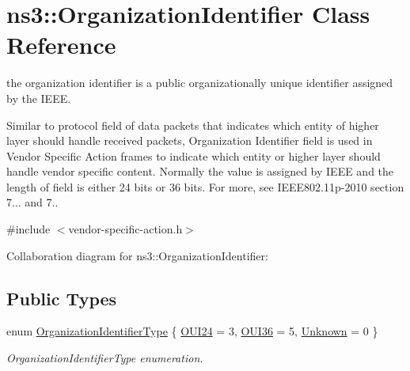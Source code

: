 \hypertarget{classns3_1_1OrganizationIdentifier}{}\section{ns3\+:\+:Organization\+Identifier Class Reference}
\label{classns3_1_1OrganizationIdentifier}


the organization identifier is a public organizationally unique identifier assigned by the I\+E\+EE.

Similar to protocol field of data packets that indicates which entity of higher layer should handle received packets, Organization Identifier field is used in Vendor Specific Action frames to indicate which entity or higher layer should handle vendor specific content. Normally the value is assigned by I\+E\+EE and the length of field is either 24 bits or 36 bits. For more, see I\+E\+E\+E802.\+11p-\/2010 section 7... and 7..  




{\ttfamily \#include $<$vendor-\/specific-\/action.\+h$>$}



Collaboration diagram for ns3\+:\+:Organization\+Identifier\+:
\subsection*{Public Types}
\begin{DoxyCompactItemize}
\item 
enum \hyperlink{classns3_1_1OrganizationIdentifier_a196c774c611f936ef8b7d2a760ff5ba2}{Organization\+Identifier\+Type} \{ \hyperlink{classns3_1_1OrganizationIdentifier_a196c774c611f936ef8b7d2a760ff5ba2acb416b621c8fbb5606ac3ddba5a24219}{O\+U\+I24} = 3, 
\hyperlink{classns3_1_1OrganizationIdentifier_a196c774c611f936ef8b7d2a760ff5ba2a812d1ac7a43fafd29b3f1dc34fa287b5}{O\+U\+I36} = 5, 
\hyperlink{classns3_1_1OrganizationIdentifier_a196c774c611f936ef8b7d2a760ff5ba2a23719ee8db159e989cc02fe8f547863e}{Unknown} = 0
 \}\begin{DoxyCompactList}\small\item\em Organization\+Identifier\+Type enumeration. \end{DoxyCompactList}
\end{DoxyCompactItemize}
